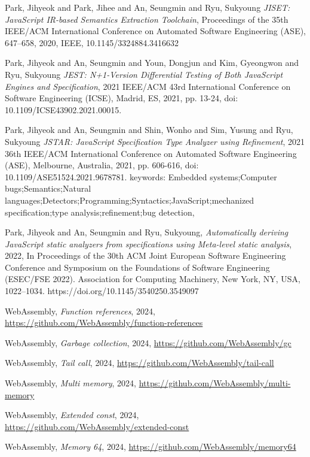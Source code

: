 \begin{thebibliography}{00}
 Park, Jihyeok and Park, Jihee and An, Seungmin and Ryu, Sukyoung \textit{JISET: JavaScript IR-based Semantics Extraction Toolchain}, Proceedings of the 35th IEEE/ACM International Conference on Automated Software Engineering (ASE), 647--658, 2020, IEEE, 10.1145/3324884.3416632

 Park, Jihyeok and An, Seungmin and Youn, Dongjun and Kim, Gyeongwon and Ryu, Sukyoung \textit{JEST: N+1-Version Differential Testing of Both JavaScript Engines and Specification}, 2021 IEEE/ACM 43rd International Conference on Software Engineering (ICSE), Madrid, ES, 2021, pp. 13-24, doi: 10.1109/ICSE43902.2021.00015.

 Park, Jihyeok and An, Seungmin and Shin, Wonho and Sim, Yusung and Ryu, Sukyoung \textit{JSTAR: JavaScript Specification Type Analyzer using Refinement}, 2021 36th IEEE/ACM International Conference on Automated Software Engineering (ASE), Melbourne, Australia, 2021, pp. 606-616, doi: 10.1109/ASE51524.2021.9678781. keywords: {Embedded systems;Computer bugs;Semantics;Natural languages;Detectors;Programming;Syntactics;JavaScript;mechanized specification;type analysis;refinement;bug detection},

 Park, Jihyeok and An, Seungmin and Ryu, Sukyoung, \textit{Automatically deriving JavaScript static analyzers from specifications using Meta-level static analysis}, 2022, In Proceedings of the 30th ACM Joint European Software Engineering Conference and Symposium on the Foundations of Software Engineering (ESEC/FSE 2022). Association for Computing Machinery, New York, NY, USA, 1022–1034. https://doi.org/10.1145/3540250.3549097

 WebAssembly, \textit{Function references}, 2024, \url{https://github.com/WebAssembly/function-references}

 WebAssembly, \textit{Garbage collection}, 2024, \url{https://github.com/WebAssembly/gc}

 WebAssembly, \textit{Tail call}, 2024, \url{https://github.com/WebAssembly/tail-call}

 WebAssembly, \textit{Multi memory}, 2024, \url{https://github.com/WebAssembly/multi-memory}

 WebAssembly, \textit{Extended const}, 2024, \url{https://github.com/WebAssembly/extended-const}

 WebAssembly, \textit{Memory 64}, 2024, \url{https://github.com/WebAssembly/memory64}


\end{thebibliography}
